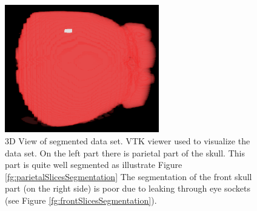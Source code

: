 \begin{figure}[h]
    \centering
    \includegraphics[width=0.6\textwidth]{data/png/3d}
    \caption[3D view of segmented skull data set]
{
3D View of segmented data set.
VTK viewer used to visualize the data set.
On the left part there is parietal part of the skull.
This part is quite well segmented as illustrate Figure \ref{fg:parietalSlicesSegmentation}
The segmentation of the front skull part (on the right side) is poor due to leaking through eye sockets (see Figure \ref{fg:frontSlicesSegmentation}).
}
    \label{fg:series3d}
\end{figure}